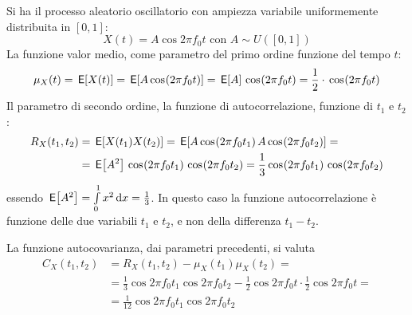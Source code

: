 \begin{esempio}
Si ha il processo aleatorio oscillatorio con ampiezza variabile uniformemente distribuita in $[0,1]$:
\[X(t)=A\cos{2\pi f_0 t}\text{ con }A\sim U([0,1]) \]
La funzione valor medio, come parametro del primo ordine funzione del tempo $t$:
\[\mu_X(t)=\,{\operatorname{\mathsf{E}}}\!\left[{X(t)}\right]=\,{\operatorname{\mathsf{E}}}\!\left[{A\,{\operatorname{cos}}^{}\!\left({2\pi f_0 t}\right)}\right]=\,{\operatorname{\mathsf{E}}}\!\left[{A}\right]\,{\operatorname{cos}}^{}\!\left({2\pi f_0 t}\right)=\frac{1}{2}\cdot\,{\operatorname{cos}}^{}\!\left({2\pi f_0 t}\right)\]
Il parametro di secondo ordine, la funzione di autocorrelazione, funzione di $t_1$ e $t_2$:
\[\begin{split}R_X(t_1,t_2)&=\E{X(t_1)X(t_2)}=\E{A\cos{2\pi f_0 t_1}A\cos{2\pi f_0 t_2}}=\\&=\E{A^2}\cos{2\pi f_0 t_1}\cos{2\pi f_0 t_2}=\frac{1}{3}\cos{2\pi f_0 t_1}\cos{2\pi f_0 t_2}\end{split}\]
essendo $\,{\operatorname{\mathsf{E}}}\!\left[{A^2}\right]=\int\limits_{0}^{1}{x^2}{\,\mathop{}\!\mathrm{d}{x}}=\frac{1}{3}$. In questo caso la funzione autocorrelazione è funzione delle due variabili $t_1$ e $t_2$, e non della differenza $t_1-t_2$.

La funzione autocovarianza, dai parametri precedenti, si valuta
\[\begin{split}C_X(t_1,t_2)&=R_X(t_1,t_2)-\mu_X(t_1)\mu_X(t_2)=\\
&=\frac{1}{3}\cos{2\pi f_0 t_1}\cos{2\pi f_0 t_2}-\frac{1}{2}\cos{2\pi f_0 t}\cdot\frac{1}{2}\cos{2\pi f_0 t}=\\&=\frac{1}{12}\cos{2\pi f_0 t_1}\cos{2\pi f_0 t_2}\end{split}\]
\end{esempio}

